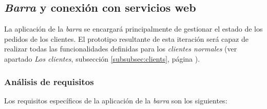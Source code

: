 \subsection{\emph{Barra} y conexión con servicios web}
La aplicación de la \emph{barra} se encargará principalmente de gestionar el
estado de los pedidos de los clientes. El prototipo resultante de esta
iteración será capaz de realizar todas las funcionalidades definidas para
los \emph{clientes normales} (ver apartado \emph{Los clientes},
subsección \ref{subsubsec:clients}, página \pageref{subsubsec:clients}).

\subsubsection{Análisis de requisitos}
Los requisitos específicos de la aplicación de la \emph{barra} son los
siguientes:
